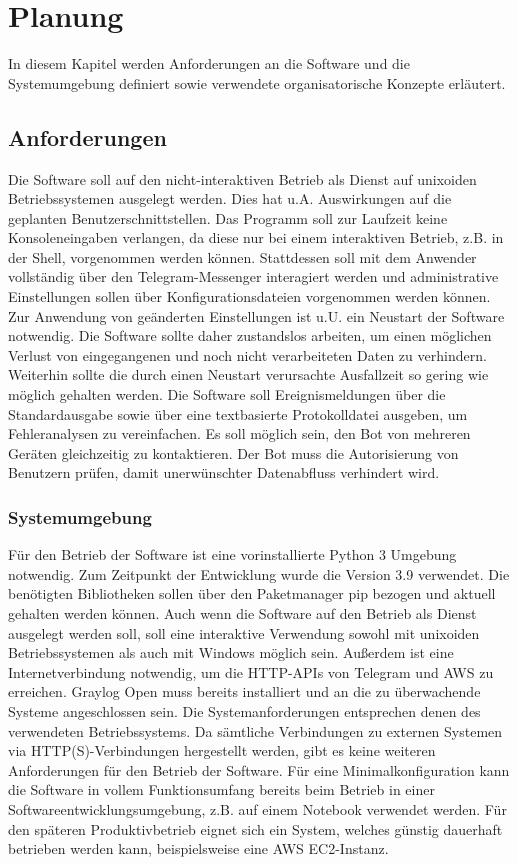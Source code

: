 \chapter{Planung}
\label{cha:planung}

In diesem Kapitel werden Anforderungen an die Software und die Systemumgebung definiert sowie verwendete organisatorische Konzepte erläutert.

\section{Anforderungen}

Die Software soll auf den nicht-interaktiven Betrieb als Dienst auf unixoiden Betriebssystemen ausgelegt werden. Dies hat u.A. Auswirkungen auf die geplanten Benutzerschnittstellen. Das Programm soll zur Laufzeit keine Konsoleneingaben verlangen, da diese nur bei einem interaktiven Betrieb, z.B. in der Shell, vorgenommen werden können. Stattdessen soll mit dem Anwender vollständig über den Telegram-Messenger interagiert werden und administrative Einstellungen sollen über Konfigurationsdateien vorgenommen werden können. Zur Anwendung von geänderten Einstellungen ist u.U. ein Neustart der Software notwendig. Die Software sollte daher zustandslos arbeiten, um einen möglichen Verlust von eingegangenen und noch nicht verarbeiteten Daten zu verhindern. Weiterhin sollte die durch einen Neustart verursachte Ausfallzeit so gering wie möglich gehalten werden. Die Software soll Ereignismeldungen über die Standardausgabe sowie über eine textbasierte Protokolldatei ausgeben, um Fehleranalysen zu vereinfachen. Es soll möglich sein, den Bot von mehreren Geräten gleichzeitig zu kontaktieren. Der Bot muss die Autorisierung von Benutzern prüfen, damit unerwünschter Datenabfluss verhindert wird.

\subsection{Systemumgebung}
Für den Betrieb der Software ist eine vorinstallierte Python 3 Umgebung notwendig. Zum Zeitpunkt der Entwicklung wurde die Version 3.9 verwendet. Die benötigten Bibliotheken sollen über den Paketmanager pip bezogen und aktuell gehalten werden können. Auch wenn die Software auf den Betrieb als Dienst ausgelegt werden soll, soll eine interaktive Verwendung sowohl mit unixoiden Betriebssystemen als auch mit Windows möglich sein. Außerdem ist eine Internetverbindung notwendig, um die HTTP-APIs von Telegram und AWS zu erreichen. Graylog Open muss bereits installiert und an die zu überwachende Systeme angeschlossen sein. Die Systemanforderungen entsprechen denen des verwendeten Betriebssystems. Da sämtliche Verbindungen zu externen Systemen via HTTP(S)-Verbindungen hergestellt werden, gibt es keine weiteren Anforderungen für den Betrieb der Software. Für eine Minimalkonfiguration kann die Software in vollem Funktionsumfang bereits beim Betrieb in einer Softwareentwicklungsumgebung, z.B. auf einem Notebook verwendet werden. Für den späteren Produktivbetrieb eignet sich ein System, welches günstig dauerhaft betrieben werden kann, beispielsweise eine AWS EC2-Instanz.

